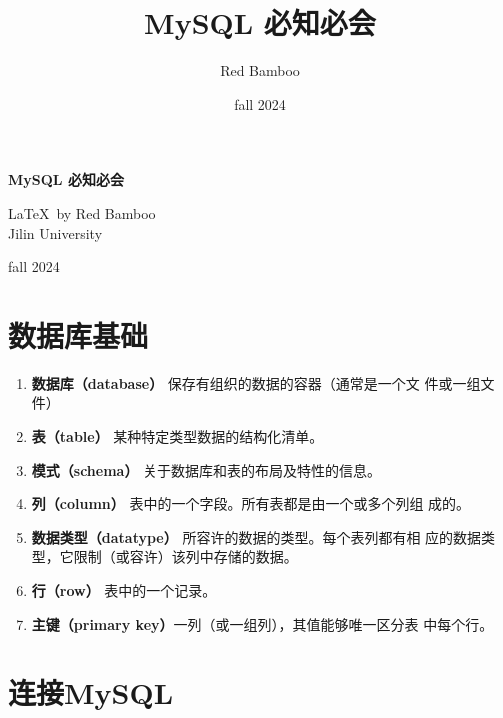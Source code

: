 \documentclass[UTF8]{article}
\title{\Huge \textbf{MySQL 必知必会}}  %
\author{Red Bamboo}
\date{fall 2024}
\begin{document}
\begin{titlepage}
    \begin{center}
    \vspace*{2cm}  %

    \Huge
    \textbf{MySQL 必知必会}
    
    \vspace{10cm}  %

    \Large
    \LaTeX \ by Red Bamboo\\
    Jilin University
    
    \vspace{0.5cm}  %
    
    fall 2024
    
    \end{center}
\end{titlepage}

\newpage %
\tableofcontents
\newpage

\section{数据库基础}
\begin{redbox}[frametitle={Defination 1}]
\begin{enumerate}
	\item \textbf{数据库（database）} 保存有组织的数据的容器（通常是一个文
    件或一组文件）
	\item \textbf{表（table）} 某种特定类型数据的结构化清单。
	\item \textbf{模式（schema）} 关于数据库和表的布局及特性的信息。
	\item \textbf{列（column）} 表中的一个字段。所有表都是由一个或多个列组
    成的。
    \item \textbf{数据类型（datatype）} 所容许的数据的类型。每个表列都有相
    应的数据类型，它限制（或容许）该列中存储的数据。
    \item \textbf{行（row）} 表中的一个记录。
    \item \textbf{主键（primary key）}一列（或一组列），其值能够唯一区分表
    中每个行。
\end{enumerate}
    
\end{redbox}
\section{连接MySQL}
\end{document}

